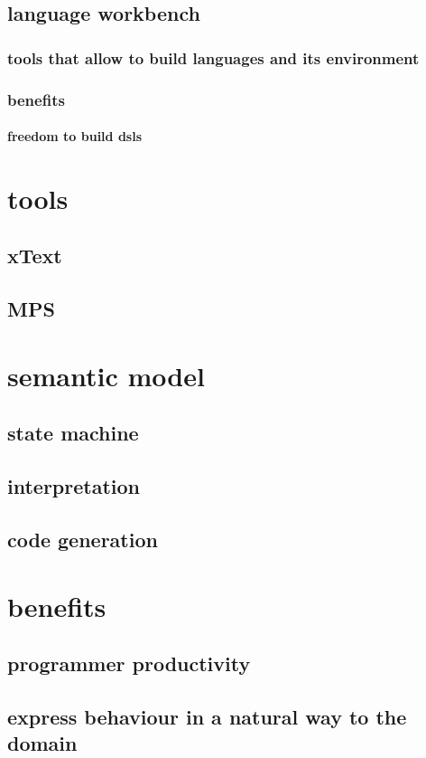 \documentclass{article}
\begin{document}
\subsection{language workbench}
\subsubsection{tools that allow to build languages and its environment}
\subsubsection{benefits}
\paragraph{freedom to build dsls}
\section{tools }
\subsection{xText }
\subsection{MPS}
\section{semantic model }
\subsection{state machine }
\subsection{interpretation}
\subsection{code generation }
\section{benefits }
\subsection{programmer productivity }
\subsection{express behaviour in a natural way to the domain}
\end{document}
